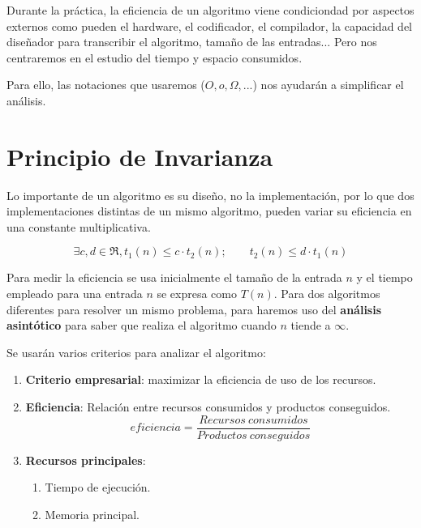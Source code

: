 \documentclass[10pt,a4paper,spanish]{report}
\theoremstyle{definition}
\theoremstyle{remark}
\begin{document}
    Durante la práctica, la eficiencia de un algoritmo viene condiciondad por aspectos externos como pueden el hardware, el codificador, el compilador, la capacidad del diseñador para transcribir el algoritmo, tamaño de las entradas... Pero nos centraremos en el estudio del tiempo y espacio consumidos.

    Para ello, las notaciones que usaremos ($O, o, \Omega,...$) nos ayudarán a simplificar el análisis.

    \section{\textcolor{YellowOrange}Principio de Invarianza}

    Lo importante de un algoritmo es su diseño, no la implementación, por lo que dos implementaciones distintas de un mismo algoritmo, pueden variar su eficiencia en una constante multiplicativa.
    
    \begin{displaymath}
        \exists c,d \in \Re, t_1(n) \leq c \cdot t_2(n); \qquad t_2(n) \leq d \cdot t_1(n)
    \end{displaymath}

    Para medir la eficiencia se usa inicialmente el tamaño de la entrada $n$ y el tiempo empleado para una entrada $n$ se expresa como $T(n)$. Para dos algoritmos diferentes para resolver un mismo problema, para haremos uso del \textbf{\textcolor{YellowOrange}{análisis asintótico}} para saber que realiza el algoritmo cuando $n$ tiende a $\infty$.

    Se usarán varios criterios para analizar el algoritmo:

    \begin{enumerate}[$\spadesuit$]
        \item \textbf{\textcolor{YellowOrange}{Criterio empresarial}}: maximizar la eficiencia de uso de los recursos.
        \item \textbf{\textcolor{YellowOrange}{Eficiencia}}: Relación entre recursos consumidos y productos conseguidos.
            \begin{displaymath}
                eficiencia = \frac{Recursos~consumidos}{Productos~conseguidos}
            \end{displaymath}
        \item \textbf{\textcolor{YellowOrange}{Recursos principales}}:
        \begin{enumerate}[$\longrightarrow$]
            \item Tiempo de ejecución.
            \item Memoria principal.
        \end{enumerate}
    \end{enumerate}
    
\end{document}
